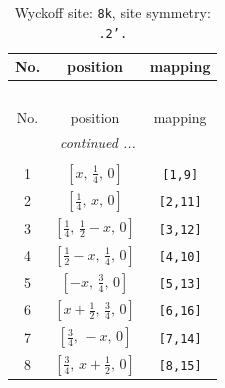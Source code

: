 \documentclass[fleqn,8pt]{jsarticle}
\begin{document}
\begin{longtable}{ccc}
\caption{Wyckoff site: {\tt 8k}, site symmetry: {\tt .2'.}}
 \\
 \hline \hline
No. & position & mapping \\ \hline \endfirsthead

\multicolumn{2}{l}{\tablename\ \thetable{}} \\
 \hline \hline
No. & position & mapping \\ \hline \endhead

 \hline \hline
\multicolumn{2}{r}{\footnotesize\it continued ...} \\ \endfoot

 \hline \hline
\multicolumn{2}{r}{} \\ \endlastfoot

1 & $\left[ x,\, \frac{1}{4},\, 0 \right]$ & {\tt [1,9]} \\ \hline
2 & $\left[ \frac{1}{4},\, x,\, 0 \right]$ & {\tt [2,11]} \\ \hline
3 & $\left[ \frac{1}{4},\, \frac{1}{2} - x,\, 0 \right]$ & {\tt [3,12]} \\ \hline
4 & $\left[ \frac{1}{2} - x,\, \frac{1}{4},\, 0 \right]$ & {\tt [4,10]} \\ \hline
5 & $\left[ - x,\, \frac{3}{4},\, 0 \right]$ & {\tt [5,13]} \\ \hline
6 & $\left[ x + \frac{1}{2},\, \frac{3}{4},\, 0 \right]$ & {\tt [6,16]} \\ \hline
7 & $\left[ \frac{3}{4},\, - x,\, 0 \right]$ & {\tt [7,14]} \\ \hline
8 & $\left[ \frac{3}{4},\, x + \frac{1}{2},\, 0 \right]$ & {\tt [8,15]} \\
\end{longtable}
\renewcommand{\arraystretch}{1.2}
\end{document}
